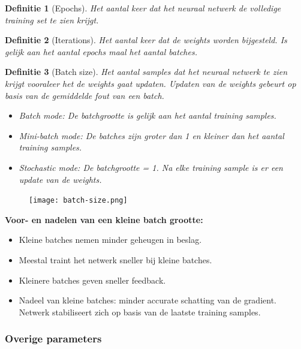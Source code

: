\documentclass{article}
\newtheorem{theorem}{Definitie}[section]
\begin{document}
\begin{theorem}[Epochs]
    Het aantal keer dat het neuraal netwerk de volledige training set te zien krijgt.
\end{theorem}

\begin{theorem}[Iterations]
    Het aantal keer dat de weights worden bijgesteld. 
    Is gelijk aan het aantal epochs maal het aantal batches.
\end{theorem}

\begin{theorem}[Batch size]
    Het aantal samples dat het neuraal netwerk te zien krijgt vooraleer het de
    weights gaat updaten. Updaten van de weights gebeurt op basis van de gemiddelde fout van
    een batch.

    \begin{itemize}
        \item Batch mode: De batchgrootte is gelijk aan het aantal training samples.
        \item Mini-batch mode: De batches zijn groter dan 1 en kleiner dan het aantal training samples.
        \item Stochastic mode: De batchgrootte = 1. Na elke training sample is er een update van de weights.
    \end{itemize}
\end{theorem}

\begin{figure}[H]
    \centering
    \texttt{[image: batch-size.png]}
    \caption{}
\end{figure}

\textbf{Voor- en nadelen van een kleine batch grootte:}

\begin{itemize}
    \item Kleine batches nemen minder geheugen in beslag.
    \item Meestal traint het netwerk sneller bij kleine batches.
    \item Kleinere batches geven sneller feedback.
    \item Nadeel van kleine batches: minder accurate schatting van de gradient. Netwerk stabiliseert zich op basis van de laatste training samples.
\end{itemize}

\subsubsection{Overige parameters}
\end{document}
